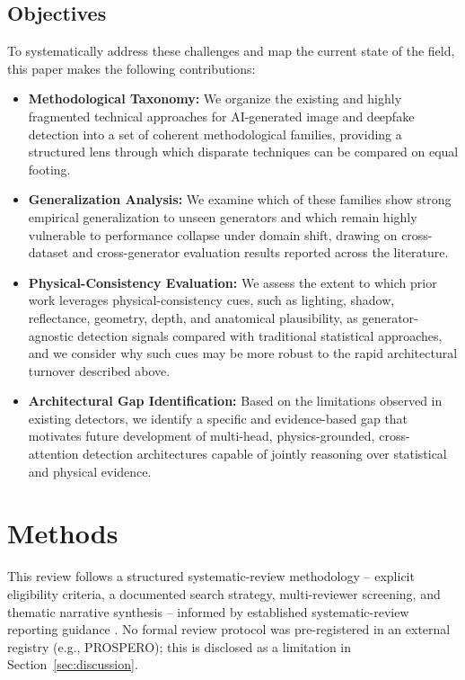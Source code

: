 \documentclass[sn-mathphys-num,Numbered,pdflatex]{sn-jnl}
\begin{document}
\subsection{Objectives}
To systematically address these challenges and map the current state of the field, this paper makes the following contributions:
\begin{itemize}
\item \textbf{Methodological Taxonomy:} We organize the existing and highly fragmented technical approaches for AI-generated image and deepfake detection into a set of coherent methodological families, providing a structured lens through which disparate techniques can be compared on equal footing.

\item \textbf{Generalization Analysis:} We examine which of these families show strong empirical generalization to unseen generators and which remain highly vulnerable to performance collapse under domain shift, drawing on cross-dataset and cross-generator evaluation results reported across the literature.

\item \textbf{Physical-Consistency Evaluation:} We assess the extent to which prior work leverages physical-consistency cues, such as lighting, shadow, reflectance, geometry, depth, and anatomical plausibility, as generator-agnostic detection signals compared with traditional statistical approaches, and we consider why such cues may be more robust to the rapid architectural turnover described above.

\item \textbf{Architectural Gap Identification:} Based on the limitations observed in existing detectors, we identify a specific and evidence-based gap that motivates future development of multi-head, physics-grounded, cross-attention detection architectures capable of jointly reasoning over statistical and physical evidence.
\end{itemize}

\section{Methods}
This review follows a structured systematic-review methodology -- explicit eligibility criteria, a documented search strategy, multi-reviewer screening, and thematic narrative synthesis -- informed by established systematic-review reporting guidance \cite{Page2021}. No formal review protocol was pre-registered in an external registry (e.g., PROSPERO); this is disclosed as a limitation in Section~\ref{sec:discussion}.
\end{document}
